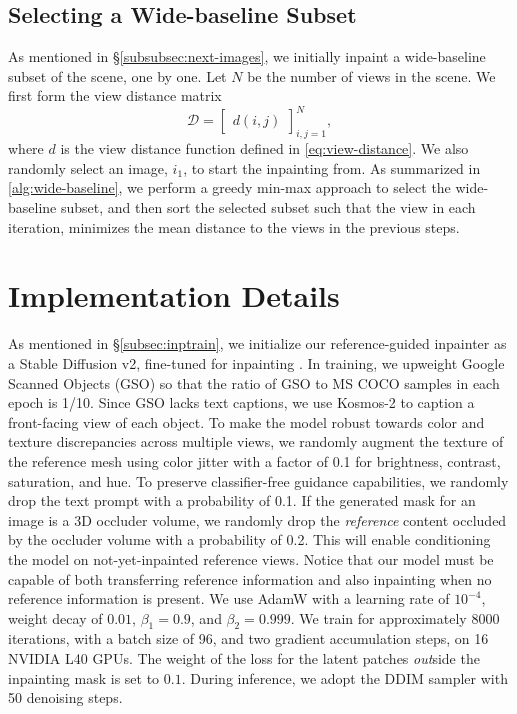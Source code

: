 \subsection{Selecting a Wide-baseline Subset}
\label{supp:subsec:wide-baseline}

As mentioned in \S\ref{subsubsec:next-images}, we initially inpaint a wide-baseline subset of the scene, one by one. Let $N$ be the number of views in the scene. We first form the view distance matrix
\begin{equation}
\mathcal{D} = \begin{bmatrix}
d(i, j)
\end{bmatrix}_{i, j = 1}^{N},
\end{equation}
where $d$ is the view distance function defined in \cref{eq:view-distance}. We also randomly select an image, $i_1$, to start the inpainting from. As summarized in \cref{alg:wide-baseline}, we perform a greedy min-max approach to select the wide-baseline subset, and then sort the selected subset such that the view in each iteration, minimizes the mean distance to the views in the previous steps.

\section{Implementation Details}
\label{supp:sec:impl}

As mentioned in \S\ref{subsec:inptrain}, we initialize our reference-guided inpainter as a Stable Diffusion v2, fine-tuned for inpainting \cite{stable.diffusion,sdinp}.
In training, we upweight Google Scanned Objects (GSO) so that the ratio of GSO to MS COCO samples in each epoch is 1/10. Since GSO lacks text captions, we use Kosmos-2 \cite{kosmos-2} to caption a front-facing view of each object. To make the model robust towards color and texture discrepancies across multiple views, we randomly augment the texture of the reference mesh using color jitter with a factor of 0.1 for brightness, contrast, saturation, and hue. To preserve classifier-free guidance \cite{ho2022classifier} capabilities, we randomly drop the text prompt with a probability of 0.1. If the generated mask for an image is a 3D occluder volume, we randomly drop the \textit{reference} content occluded by the occluder volume with a probability of 0.2. This will enable conditioning the model on not-yet-inpainted reference views. Notice that our model must be capable of both transferring reference information and also inpainting when no reference information is present.
We use AdamW \cite{adamw} with a learning rate of $10^{-4}$, weight decay of $0.01$, $\beta_1 = 0.9$, and $\beta_2 = 0.999$. 
We train for approximately 8000 iterations, with a batch size of 96, and two gradient accumulation steps, on 16 NVIDIA L40 GPUs. 
The weight of the loss for the latent patches \textit{out}side the inpainting mask is set to $0.1$. During inference, we adopt the DDIM sampler \cite{ddim} with 50 denoising steps.

